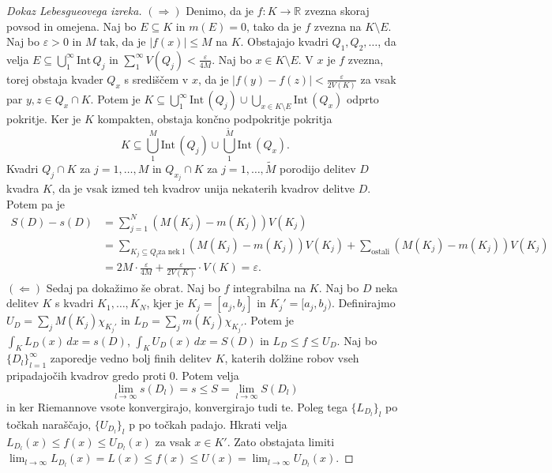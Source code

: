 \documentclass[10pt, a4paper]{article}
\newenvironment{noticeC}{%
  \tcolorbox[%
  notitle,
  empty,
  enhanced,  %
  breakable,
  coltext=black, 
  fontupper=\rmfamily,
  parbox=false,
  noparskip,
  sharp corners,
  boxrule=-1pt,  %
  frame hidden,
  left=7pt,  %
  right=7pt,
  top=5pt,
  bottom=5pt,
  before skip=2.5ex plus 2pt,
  after skip=2.5ex plus 2pt,
  overlay unbroken and last={%
  },
  ]}
{\endtcolorbox}
\newenvironment{dokaz}%
  {\begin{noticeC}\begin{proof}}%
  {\end{proof}\end{noticeC}}
\newcommand{\R}{\mathbb {R}}
\newcommand{\inte}{\mathrm{Int}}
\begin{document}
\begin{dokaz}[Dokaz Lebesgueovega izreka]
    $(\Rightarrow)$ Denimo, da je $f: K \to \R$ zvezna skoraj povsod in omejena.
    Naj bo $E \subseteq K$ in $m(E) = 0$, tako da je $f$ zvezna na $K \setminus E$.
    Naj bo $\varepsilon > 0$ in $M$ tak, da je $|f(x)| \leq M$ na $K$.
    Obstajajo kvadri $Q_1, Q_2, \dots$, da velja $E \subseteq \bigcup_1 ^\infty \inte\, Q_j$
    in $\sum_1 ^\infty V(Q_j) < \frac{\varepsilon}{4M}$.
    Naj bo $x \in K \setminus E$.
    V $x$ je $f$ zvezna, torej obstaja kvader $Q_x$ s središčem v $x$,
    da je $|f(y) - f(z)| < \frac{\varepsilon}{2 V(K)}$ za vsak par $y, z \in Q_x \cap K$.
    Potem je $K \subseteq \bigcup_1 ^\infty \inte\, (Q_j) \cup \bigcup_{x \in K \setminus E} \inte\, (Q_x)$
    odprto pokritje.
    Ker je $K$ kompakten, obstaja končno podpokritje pokritja $$K \subseteq \bigcup_1 ^M \inte\, (Q_j) \cup \bigcup_1 ^{\widetilde{M}} \inte\, (Q_x).$$
    Kvadri $Q_j \cap K$ za $j = 1, \dots, M$ in $Q_{x_j} \cap K$ za $j = 1, \dots, \widetilde{M}$
    porodijo delitev $D$ kvadra $K$, da je vsak izmed teh kvadrov unija nekaterih kvadrov delitve $D$.
    Potem pa je 
    \begin{align*}
        S(D) - s(D) &= \sum_{j = 1} ^N (M(K_j) - m(K_j)) V(K_j)\\
        &= \sum_{K_j \subseteq Q_l \mathrm{\text{za nek $l$}}} (M(K_j) - m(K_j)) V(K_j) + \sum_{\mathrm{ostali}} (M(K_j) - m(K_j)) V(K_j)\\
        &= 2M \cdot \frac{\varepsilon}{4M} + \frac{\varepsilon}{2V(K)} \cdot V(K) = \varepsilon.
    \end{align*}
    $(\Leftarrow)$ Sedaj pa dokažimo še obrat. Naj bo $f$ integrabilna na $K$.
    Naj bo $D$ neka delitev $K$ s kvadri $K_1, \dots, K_N$, kjer je $K_j = [a_j, b_j]$ in $K_j ' = [a_j, b_j)$.
    Definirajmo $U_D = \sum_j M(K_j) \chi_{K_j '}$ in $L_D = \sum_j m(K_j) \chi_{K_j '}$.
    Potem je $\int_K L_D (x)\, dx = s(D)$, $\int_K U_D (x)\, dx = S(D)$ in $L_D \leq f \leq U_D$.
    Naj bo $\{ D_l\}_{l = 1} ^\infty$ zaporedje vedno bolj finih delitev $K$,
    katerih dolžine robov vseh pripadajočih kvadrov gredo proti $0$.
    Potem velja $$\lim_{l \to \infty} s(D_l) = s \leq S = \lim_{l \to \infty} S(D_l)$$
    in ker Riemannove vsote konvergirajo, konvergirajo tudi te.
    Poleg tega $\{L_{D_l}\}_l$ po točkah naraščajo, $\{U_{D_l}\}_l$ p po točkah padajo.
    Hkrati velja $L_{D_l} (x) \leq f(x) \leq U_{D_l} (x)$ za vsak $x \in K'$.
    Zato obstajata limiti $\lim_{l \to \infty} L_{D_l} (x) = L(x) \leq f(x) \leq U(x) = \lim_{l \to \infty} U_{D_l} (x)$.

\end{dokaz}
\end{document}
